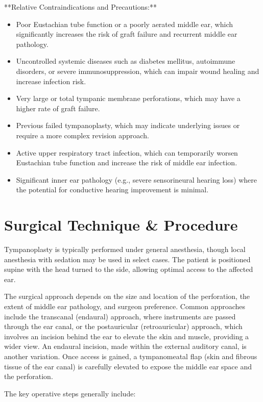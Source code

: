 **Relative Contraindications and Precautions:**

\begin{itemize}
  \item Poor Eustachian tube function or a poorly aerated middle ear, which significantly increases the risk of graft failure and recurrent middle ear pathology.
  \item Uncontrolled systemic diseases such as diabetes mellitus, autoimmune disorders, or severe immunosuppression, which can impair wound healing and increase infection risk.
  \item Very large or total tympanic membrane perforations, which may have a higher rate of graft failure.
  \item Previous failed tympanoplasty, which may indicate underlying issues or require a more complex revision approach.
  \item Active upper respiratory tract infection, which can temporarily worsen Eustachian tube function and increase the risk of middle ear infection.
  \item Significant inner ear pathology (e.g., severe sensorineural hearing loss) where the potential for conductive hearing improvement is minimal.
\end{itemize}

\section*{Surgical Technique \& Procedure}
Tympanoplasty is typically performed under general anesthesia, though local anesthesia with sedation may be used in select cases. The patient is positioned supine with the head turned to the side, allowing optimal access to the affected ear.

The surgical approach depends on the size and location of the perforation, the extent of middle ear pathology, and surgeon preference. Common approaches include the transcanal (endaural) approach, where instruments are passed through the ear canal, or the postauricular (retroauricular) approach, which involves an incision behind the ear to elevate the skin and muscle, providing a wider view. An endaural incision, made within the external auditory canal, is another variation. Once access is gained, a tympanomeatal flap (skin and fibrous tissue of the ear canal) is carefully elevated to expose the middle ear space and the perforation.

The key operative steps generally include:

